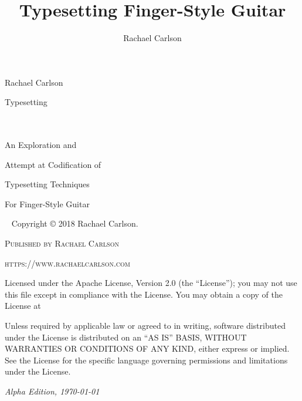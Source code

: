\documentclass[]{memoir}
\title{Typesetting Finger-Style Guitar}
\author{Rachael Carlson}
\begin{document}
\frontmatter

\pagestyle{empty}
\begin{flushright}
  Rachael Carlson\\
\end{flushright}
\vspace*{1in}
{\Huge \textsf{Typesetting}}\\

\vspace*{.15in}
\\

\vspace*{.15in}
\\
\begin{flushright}
  {\Large An Exploration and} \\
\end{flushright}
\begin{flushright}
  {\Large Attempt at Codification of} \\
\end{flushright}
\begin{flushright}
  {\Large Typesetting Techniques}\\
\end{flushright}
\begin{flushright}
  {\Large For Finger-Style Guitar}\\
\end{flushright}

\vspace*{1in}


\clearpage
\newpage
  ~\vfill
  \thispagestyle{empty}
  \setlength{\parindent}{0pt}
  \setlength{\parskip}{\baselineskip}
  Copyright © 2018 Rachael Carlson.

  \par\textsc{Published by Rachael Carlson}

  \par\textsc{https://www.rachaelcarlson.com}

  \par Licensed under the Apache License, Version 2.0 (the
  ``License''); you may not use this file except in compliance with
  the License. You may obtain a copy of the License at
  
  Unless required by
  applicable law or agreed to in writing, software distributed under
  the License is distributed on an \textsc{``AS IS'' BASIS, WITHOUT
    WARRANTIES OR CONDITIONS OF ANY KIND}, either express or
  implied. See the License for the specific language governing
  permissions and limitations under the License.

  \par\textit{Alpha Edition, \today}

  
\end{document}
